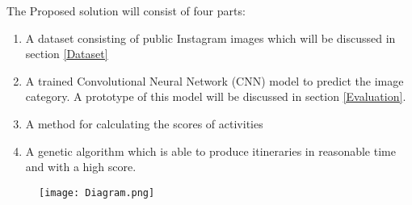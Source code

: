 The Proposed solution will consist of four parts:

\begin{enumerate}
    \item A dataset consisting of public Instagram images which will
    be discussed in section \ref{Dataset}
    \item A trained Convolutional Neural Network (CNN) model to
    predict the image category. A prototype of this model will be
    discussed in section \ref{Evaluation}.
    \item A method for calculating the scores of activities
    \item A genetic algorithm which is able to produce itineraries in
    reasonable time and with a high score.
\end{enumerate}


\begin{figure}[H]
    \centering
    \texttt{[image: Diagram.png]}
    \label{diagram}
\end{figure}